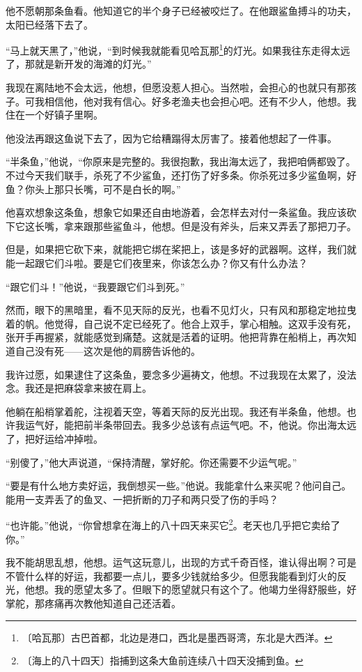 \documentclass[12pt,UTF-8,openany]{ctexbook}
\begin{document}
\begin{large}
    他不愿朝那条鱼看。他知道它的半个身子已经被咬烂了。在他跟鲨鱼搏斗的功夫，太阳已经落下去了。
    
    “马上就天黑了，”他说，“到时候我就能看见哈瓦那\footnote{〔哈瓦那〕古巴首都，北边是港口，西北是墨西哥湾，东北是大西洋。}的灯光。如果我往东走得太远了，那就是新开发的海滩的灯光。”
    
    我现在离陆地不会太远，他想，但愿没惹人担心。当然啦，会担心的也就只有那孩子。可我相信他，他对我有信心。好多老渔夫也会担心吧。还有不少人，他想。我住在一个好镇子里啊。
    
    他没法再跟这鱼说下去了，因为它给糟蹋得太厉害了。接着他想起了一件事。
    
    “半条鱼，”他说，“你原来是完整的。我很抱歉，我出海太远了，我把咱俩都毁了。不过今天我们联手，杀死了不少鲨鱼，还打伤了好多条。你杀死过多少鲨鱼啊，好鱼？你头上那只长嘴，可不是白长的啊。”
    
    他喜欢想象这条鱼，想象它如果还自由地游着，会怎样去对付一条鲨鱼。我应该砍下它这长嘴，拿来跟那些鲨鱼斗，他想。但是没有斧头，后来又弄丢了那把刀子。
    
    但是，如果把它砍下来，就能把它绑在桨把上，该是多好的武器啊。这样，我们就能一起跟它们斗啦。要是它们夜里来，你该怎么办？你又有什么办法？
    
    “跟它们斗！”他说，“我要跟它们斗到死。”
    
    然而，眼下的黑暗里，看不见天际的反光，也看不见灯火，只有风和那稳定地拉曳着的帆。他觉得，自己说不定已经死了。他合上双手，掌心相触。这双手没有死，张开手再握紧，就能感觉到痛楚。这就是活着的证明。他把背靠在船梢上，再次知道自己没有死——这次是他的肩膀告诉他的。
    
    我许过愿，如果逮住了这条鱼，要念多少遍祷文，他想。不过我现在太累了，没法念。我还是把麻袋拿来披在肩上。
    
    他躺在船梢掌着舵，注视着天空，等着天际的反光出现。我还有半条鱼，他想。也许我运气好，能把前半条带回去。我多少总该有点运气吧。不，他说。你出海太远了，把好运给冲掉啦。
    
    “别傻了，”他大声说道，“保持清醒，掌好舵。你还需要不少运气呢。”
    
    “要是有什么地方卖好运，我倒想买一些。”他说。我能拿什么来买呢？他问自己。能用一支弄丢了的鱼叉、一把折断的刀子和两只受了伤的手吗？
    
    “也许能。”他说，“你曾想拿在海上的八十四天来买它\footnote{〔海上的八十四天〕指捕到这条大鱼前连续八十四天没捕到鱼。}。老天也几乎把它卖给了你。”
    
    我不能胡思乱想，他想。运气这玩意儿，出现的方式千奇百怪，谁认得出啊？可是不管什么样的好运，我都要一点儿，要多少钱就给多少。但愿我能看到灯火的反光，他想。我的愿望太多了。但眼下的愿望就只有这个了。他竭力坐得舒服些，好掌舵，那疼痛再次教他知道自己还活着。
    

\end{large}
\end{document}
